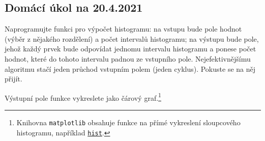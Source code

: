 \documentclass[a4paper,11pt,twoside]{article}
\def\code#1{\textnormal{\texttt{#1}}}
\theoremstyle{red}
\theoremstyle{green}
\begin{document}
\newpage
{\color{red}\subsection{Domácí úkol na 20.4.2021}}
    \begin{task}
        Naprogramujte funkci pro výpočet histogramu: na vstupu bude pole hodnot (výběr z nějakého rozdělení) a počet intervalů histogramu; na výstupu bude pole, jehož každý prvek bude odpovídat jednomu intervalu histogramu a ponese počet hodnot, které do tohoto intervalu padnou ze vstupního pole.
        Nejefektivnějšímu algoritmu stačí jeden průchod vstupním polem (jeden cyklus). 
        Pokuste se na něj přijít.

        Výstupní pole funkce vykreslete jako čárový graf.\footnote{
            Knihovna \code{matplotlib} obsahuje funkce na přímé vykreslení sloupcového histogramu, například \code{\href{https://matplotlib.org/stable/api/_as_gen/matplotlib.pyplot.hist.html}{hist}}.
        }
    \end{task}
\end{document}

